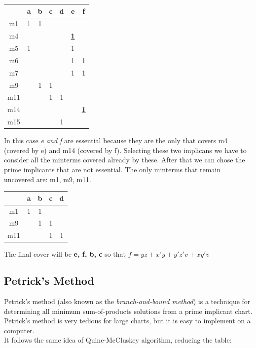 \begin{center}
	
	\begin{tabular}{|c| c c c c c c|}
		\hline
		{} & a & b & c & d & \textbf{e} & \textbf{f} \\ \hline
		m1 & 1 & 1 & {} & {} & {} & {} \\
		m4 & {} & {} & {} & {} & \underline{\textbf{1}} & {} \\
		m5 & 1 & {} & {} & {} & 1 & {} \\
		m6 & {} & {} & {} & {} & 1 & 1 \\
		m7 & {} & {} & {} & {} & 1 & 1 \\
		m9 & {} & 1 & 1 & {} & {} & {} \\
		m11 & {} & {} & 1 & 1 & {} & {} \\
		m14 & {} & {} & {} & {} & {} & \underline{\textbf{1}} \\
		m15 & {} & {} & {} & 1 & {} & {} \\ \hline
		
	\end{tabular}
	
\bigskip
In this case \textit{e and f} are essential because they are the only that covers m4 (covered by e) and m14 (covered by f). Selecting these two implicans we have to consider all the minterms covered already by these. After that we can chose the prime implicants that are not essential. The only minterms that remain uncovered are: m1, m9, m11.

	\begin{tabular}{|c| c c c c |}
		\hline
		{} & a & \textbf{b} & \textbf{c} & d  \\ \hline
		m1 & 1 & 1 & {} & {} \\
		m9 & {} & 1 & 1 & {} \\
		m11 & {} & {} & 1 & 1 \\ \hline
	
	\end{tabular}
\bigskip

The final cover will be \textbf{ e, f, b, c } so that $f = yz + x'y + y'z'v + xy'v$ 

\end{center}

\subsection{Petrick's Method}


Petrick's method (also known as the \textit{branch-and-bound method}) is a technique for determining all minimum sum-of-products solutions from a prime implicant chart. Petrick's method is very tedious for large charts, but it is easy to implement on a computer. \\
It follows the same idea of Quine-McCluskey algorithm, reducing the table:

